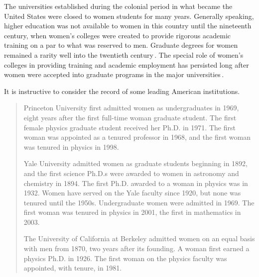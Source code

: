 \documentclass[twoside,symmetric]{tufte-handout}
\begin{document}
The universities established during the colonial period in what became the United States were closed to women students for many years. Generally speaking, higher education was not available to women in this country until the nineteenth century, when women's colleges were created to provide rigorous academic training on a par to what was reserved to men. Graduate degrees for women remained a rarity well into the twentieth century$\,$\cite[-48pt]{10.2307/367747,10.2307/40222081}. The special role of women's colleges in providing training and academic employment has persisted long after women were accepted into graduate programs in the major universities$\,$\cite{10.1088/978-1-6817-4094-2ch5}.



It is instructive to consider the record of some leading American institutions.
\vspace*{-6pt}
\begin{quote}
Princeton University first admitted women as undergraduates in 1969, eight years after the first full-time woman graduate student. The first female physics graduate student received her Ph.D.  in 1971. The first woman was appointed as a tenured professor in 1968, and the first woman was tenured in physics in 1998.

Yale University admitted women as graduate students beginning in 1892, and the first science Ph.D.s were awarded to women in astronomy and chemistry in 1894. The first Ph.D. awarded to a woman in physics was in 1932. Women have served on the Yale faculty since 1920, but none was tenured until the 1950s. Undergraduate women were admitted in 1969. The first woman was tenured in physics in 2001, the first in mathematics in 2003.

The University of California at Berkeley admitted women on an equal basis with men from 1870, two years after its founding. A woman first earned a physics Ph.D. in 1926. The first woman on the physics faculty was appointed, with tenure, in 1981.

\end{quote}
\end{document}
